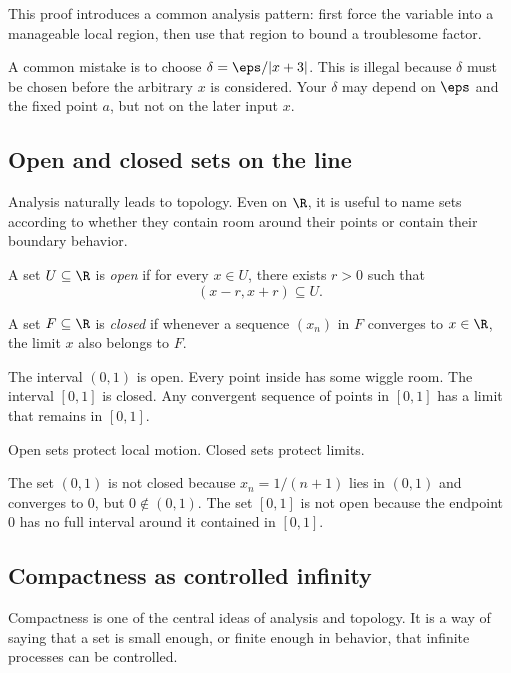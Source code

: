 This proof introduces a common analysis pattern: first force the variable into
a manageable local region, then use that region to bound a troublesome factor.

\begin{trapbox}
A common mistake is to choose $\delta=\eps/|x+3|$. This is illegal because
$\delta$ must be chosen before the arbitrary $x$ is considered. Your $\delta$
may depend on $\eps$ and the fixed point $a$, but not on the later input $x$.
\end{trapbox}

\subsection{Open and closed sets on the line}

Analysis naturally leads to topology. Even on $\R$, it is useful to name sets
according to whether they contain room around their points or contain their
boundary behavior.

\begin{definition}
A set $U\subseteq\R$ is \emph{open} if for every $x\in U$, there exists
$r>0$ such that
\[
(x-r,x+r)\subseteq U.
\]
\end{definition}

\begin{definition}
A set $F\subseteq\R$ is \emph{closed} if whenever a sequence $(x_n)$ in $F$
converges to $x\in\R$, the limit $x$ also belongs to $F$.
\end{definition}

The interval $(0,1)$ is open. Every point inside has some wiggle room. The
interval $[0,1]$ is closed. Any convergent sequence of points in $[0,1]$ has a
limit that remains in $[0,1]$.

\begin{intuitionbox}
Open sets protect local motion. Closed sets protect limits.
\end{intuitionbox}

The set $(0,1)$ is not closed because $x_n=1/(n+1)$ lies in $(0,1)$ and converges
to $0$, but $0\notin(0,1)$. The set $[0,1]$ is not open because the endpoint
$0$ has no full interval around it contained in $[0,1]$.

\subsection{Compactness as controlled infinity}

Compactness is one of the central ideas of analysis and topology. It is a way
of saying that a set is small enough, or finite enough in behavior, that infinite
processes can be controlled.

